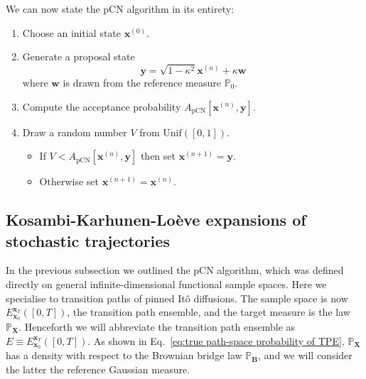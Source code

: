
We can now state the pCN algorithm in its entirety:
\begin{enumerate}
\item Choose an initial state $\mathbf{x}^{(0)}$.

\item Generate a proposal state
	\begin{equation} \label{eq:pCN update rule}
		\mathbf{y} = \sqrt{1 - \kappa^2} \mathbf{x}^{(n)} + \kappa \mathbf{w}
	\end{equation}
	where $\mathbf{w}$ is drawn from the reference measure $\mathbb{P}_0$.
	
\item Compute the acceptance probability $A_\text{pCN}[\mathbf{x}^{(n)}, \mathbf{y}]$.
	
\item Draw a random number $V$ from $\text{Unif}([0,1])$.
	\begin{itemize}
		\item If $V < A_\text{pCN}[\mathbf{x}^{(n)}, \mathbf{y}]$ then set $\mathbf{x}^{(n+1)} = \mathbf{y}$.
		\item Otherwise set $\mathbf{x}^{(n+1)} = \mathbf{x}^{(n)}$.
	\end{itemize}
\end{enumerate}

\subsection{Kosambi-Karhunen-Lo\`eve expansions of stochastic trajectories} \label{sec:Kosambi-Karhunen-Loeve expansions of stochastic trajectories}
 
In the previous subsection we outlined the pCN algorithm, which was defined directly on general infinite-dimensional functional sample spaces. Here we specialise to transition paths of pinned It\^{o} diffusions. The sample space is now $E_{\mathbf{x}_0}^{\mathbf{x}_T}([0,T])$, the transition path ensemble, and the target measure is the law $\mathbb{P}_\mathbf{X}$. Henceforth we will abbreviate the transition path ensemble as $E \equiv E_{\mathbf{x}_0}^{\mathbf{x}_T}([0,T])$. As shown in Eq.~\ref{eq:true path-space probability of TPE}, $\mathbb{P}_\mathbf{X}$ has a density with respect to the Brownian bridge law $\mathbb{P}_\mathbf{B}$, and we will consider the latter the reference Gaussian measure.

